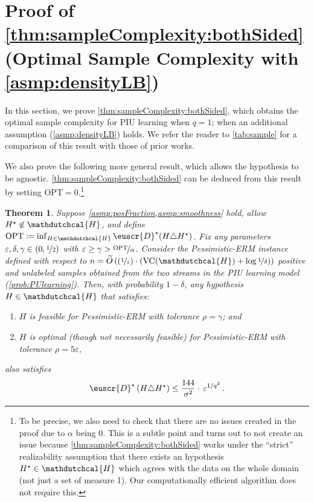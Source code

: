 \documentclass[11pt]{article}
\theoremstyle{plain}
\newtheorem{theorem}{Theorem}[section]
\theoremstyle{definition}
\theoremstyle{remark}
\newcommand{\inparen}[1]{\left(#1\right)}
\newcommand{\nfrac}[2]{\nicefrac{#1}{#2}}
\newcommand{\opt}{\ensuremath{\mathrm{OPT}}}
\newcommand{\vc}{\textrm{\rm VC}}
\newcommand{\eps}{\varepsilon}
\newcommand{\wt}[1]{\widetilde{#1}}
\newcommand{\customcal}[1]{\euscr{#1}}
\newcommand{\cD}{\customcal{D}}
\newcommand{\hypo}[1]{\mathdutchcal{#1}}
\newcommand{\hyH}{\hypo{H}}
\newcommand{\pERM}{Pessimistic-ERM}
\newcommand{\optset}{{H^\star}}
\newcommand{\cDtrue}{\cD^\star}
\begin{document}
    

\section{Proof of \cref{thm:sampleComplexity:bothSided} (Optimal Sample Complexity with \cref{asmp:densityLB})} 
    In this section, we prove \cref{thm:sampleComplexity:bothSided}, which obtains the optimal sample complexity for PIU learning when $q=1$; when an additional assumption (\cref{asmp:densityLB}) holds. %
    \optimalSampleComplexity*
    \noindent We refer the reader to \cref{tab:sample} for a comparison of this result with those of prior works. 

    We also prove the following more general result, which allows the hypothesis to be agnostic.
    \cref{thm:sampleComplexity:bothSided} can be deduced from this result by setting $\opt=0$.\footnote{To be precise, we also need to check that there are no issues created in the proof due to $\alpha$ being $0$. This is a subtle point and turns out to not create an issue because \cref{thm:sampleComplexity:bothSided} works under the ``strict'' realizability assumption that there exists an hypothesis $\optset\in \hyH$ which agrees with the data on the whole domain (not just a set of measure 1). 
    Our computationally efficient algorithm does not require this.
    }
    \begin{theorem}\label{new:thm:perm:robust}
        Suppose \cref{asmp:posFraction,asmp:smoothness} hold, allow $\optset\not\in \hyH$, and define $\opt\coloneqq \inf_{H\in \hyH} \cDtrue(H\triangle \optset)$.
        Fix any parameters $\eps,\delta, \gamma \in (0,\nfrac{1}{2})$ with $\eps\geq \gamma > {\nfrac{\opt}{\alpha}}$.  
        Consider the \pERM{} instance defined with respect to $n=\wt{O}\inparen{\inparen{\nfrac{1}{\eps}}\cdot \inparen{\vc{}(\hyH)+\log{\nfrac{1}{\delta}}}}$  positive and unlabeled samples obtained from the two streams in the PIU learning model (\cref{prob:PUlearning}).
        Then, with probability $1-\delta$, any hypothesis $H\in \hyH$ that satisfies:
        \begin{enumerate}
            \item $H$ is feasible for \pERM{} with tolerance $\rho= \gamma $; and 
            \item $H$ is optimal (though not necessarily feasible) for \pERM{} with tolerance $\rho= {5\eps} $,
        \end{enumerate}
        also satisfies
        \[
            \cDtrue\inparen{H\triangle \optset} \leq 
                \frac{144}{\sigma^2}\cdot \, \eps^{1/q^2}
                \,.
        \]
    \end{theorem}
        
\end{document}
